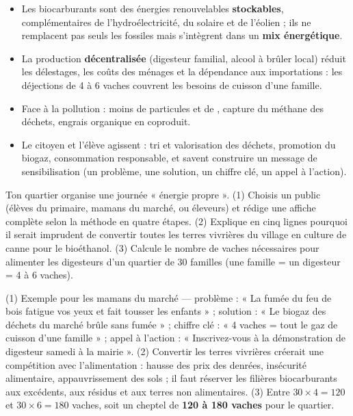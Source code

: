 \documentclass[11pt]{article}
\begin{document}
\begin{aretenir}
\begin{itemize}
\item Les biocarburants sont des énergies renouvelables \textbf{stockables}, complémentaires de l'hydroélectricité, du solaire et de l'éolien ; ils ne remplacent pas seuls les fossiles mais s'intègrent dans un \textbf{mix énergétique}.
\item La production \textbf{décentralisée} (digesteur familial, alcool à brûler local) réduit les délestages, les coûts des ménages et la dépendance aux importations : les déjections de 4 à 6 vaches couvrent les besoins de cuisson d'une famille.
\item Face à la pollution : moins de particules et de , capture du méthane des déchets, engrais organique en coproduit.
\item Le citoyen et l'élève agissent : tri et valorisation des déchets, promotion du biogaz, consommation responsable, et savent construire un message de sensibilisation (un problème, une solution, un chiffre clé, un appel à l'action).
\end{itemize}
\end{aretenir}

\begin{exercice}
Ton quartier organise une journée « énergie propre ». (1) Choisis un public (élèves du primaire, mamans du marché, ou éleveurs) et rédige une affiche complète selon la méthode en quatre étapes. (2) Explique en cinq lignes pourquoi il serait imprudent de convertir toutes les terres vivrières du village en culture de canne pour le bioéthanol. (3) Calcule le nombre de vaches nécessaires pour alimenter les digesteurs d'un quartier de 30 familles (une famille = un digesteur = 4 à 6 vaches).
\end{exercice}

\begin{corrige}
(1) Exemple pour les mamans du marché — problème : « La fumée du feu de bois fatigue vos yeux et fait tousser les enfants » ; solution : « Le biogaz des déchets du marché brûle sans fumée » ; chiffre clé : « 4 vaches = tout le gaz de cuisson d'une famille » ; appel à l'action : « Inscrivez-vous à la démonstration de digesteur samedi à la mairie ». (2) Convertir les terres vivrières créerait une compétition avec l'alimentation : hausse des prix des denrées, insécurité alimentaire, appauvrissement des sols ; il faut réserver les filières biocarburants aux excédents, aux résidus et aux terres non alimentaires. (3) Entre $30 \times 4 = 120$ et $30 \times 6 = 180$ vaches, soit un cheptel de \textbf{120 à 180 vaches} pour le quartier.
\end{corrige}
\end{document}
